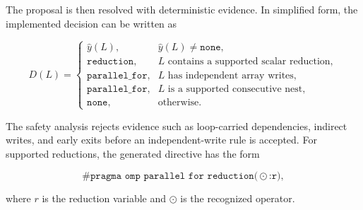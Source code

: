 \documentclass[12pt,a4paper]{report}
\begin{document}
The proposal is then resolved with deterministic evidence. In simplified form,
the implemented decision can be written as

\begin{equation}
D(L)=
\begin{cases}
\hat{y}(L), & \hat{y}(L)\neq\texttt{none},\\
\texttt{reduction}, & L\text{ contains a supported scalar reduction},\\
\texttt{parallel\_for}, & L\text{ has independent array writes},\\
\texttt{parallel\_for}, & L\text{ is a supported consecutive nest},\\
\texttt{none}, & \text{otherwise}.
\end{cases}
\label{eq:parallelizer-decision}
\end{equation}

The safety analysis rejects evidence such as loop-carried dependencies,
indirect writes, and early exits before an independent-write rule is accepted.
For supported reductions, the generated directive has the form

\begin{equation}
\texttt{\#pragma omp parallel for reduction(}\odot\texttt{:r)},
\end{equation}

where $r$ is the reduction variable and $\odot$ is the recognized operator.
\end{document}
